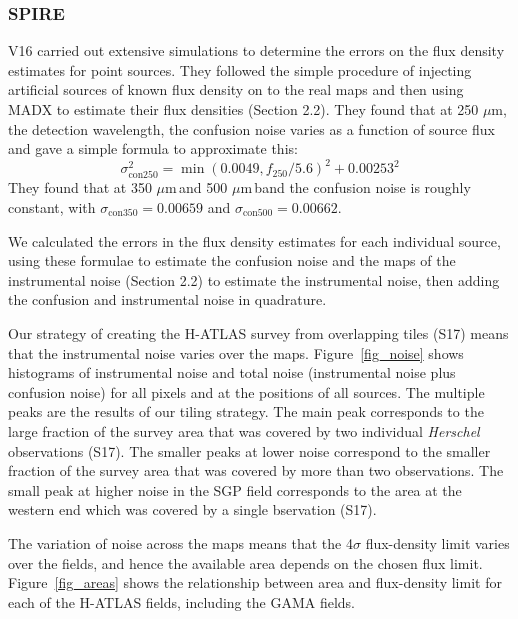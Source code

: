 \documentclass[useAMS,usenatbib]{mnras}
\def\mic{ $\mu $m\,}
\begin{document}
\subsubsection{SPIRE}

V16 carried out extensive simulations to determine the
errors on the flux density estimates for point sources.
They followed the simple procedure of injecting artificial
sources of known flux density on to the real maps and then
using MADX to estimate their flux densities
(Section 2.2).  
They found that at 250 $\mu$m, the detection
wavelength, the confusion noise varies as a function
of source flux and gave a simple formula to approximate this:
\smallskip
\begin{equation}
\sigma_{\mathrm{con}250}^2 = \min(0.0049,f_{250}/5.6)^2 + 0.00253^2
\end{equation}
\smallskip
\noindent They found that
at 350\mic and 500\mic band the confusion noise 
is roughly constant, with $\sigma_{\mathrm{con}350} = 0.00659$ and
$\sigma_{\mathrm{con}500} = 0.00662$.

We calculated the errors in the flux density estimates for each
individual source, using these formulae to estimate the confusion
noise and the maps of the instrumental noise (Section 2.2) to estimate
the instrumental noise, then adding the confusion and instrumental
noise in quadrature.


Our strategy of creating the H-ATLAS survey from overlapping tiles
(S17) means that the instrumental noise varies over the maps.
Figure~\ref{fig_noise} shows histograms of instrumental noise and
total noise (instrumental noise plus confusion noise) for all pixels
and at the positions of all sources.  The multiple peaks are the
results of our tiling strategy. The main peak corresponds to the large
fraction of the survey area that was covered by two individual {\it
  Herschel} observations (S17). The smaller peaks at lower noise
correspond to the smaller fraction of the survey area that was 
covered by more than two observations. The small peak at higher noise
in the SGP field corresponds to the area at the western end which was
covered by a single bservation (S17).

The variation of noise across the maps means that the 4$\sigma$
flux-density limit varies over the fields, and hence the available
area depends on the chosen flux limit. Figure~\ref{fig_areas}
shows the relationship between area and flux-density limit for each of
the H-ATLAS fields, including the GAMA fields.
\end{document}
